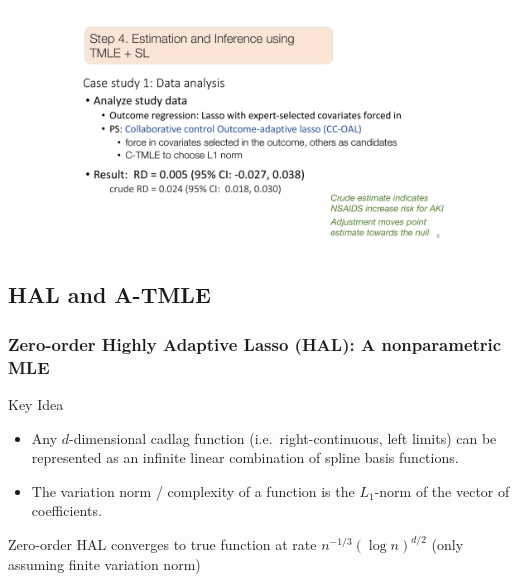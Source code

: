 \documentclass[t]{beamer}
\begin{document}
\begin{frame}
\centering
\begin{figure}
\begin{center}
\includegraphics[width=1.02\textwidth]{figures/abbviepdfslides_8.pdf}
\end{center}
\end{figure}
\end{frame}

\subsection{HAL and A-TMLE}

\begin{frame}
\frametitle{Zero-order Highly Adaptive Lasso (HAL): A nonparametric MLE}
\begin{block}{\large{Key Idea}}
\begin{itemize}
\vspace{.1in}
\item Any $d$-dimensional cadlag function (i.e.~right-continuous, left limits)
can be represented as an infinite linear combination of spline basis functions.
\vspace{.05in}
\item The variation norm / complexity of a function is the $L_1$-norm of the vector of coefficients.
\vspace{.1in}
\end{itemize}
\end{block}
\vspace{0.25in}
\begin{center}
{\large Zero-order HAL converges to true function at rate $n^{-1/3}(\log n)^{d/2}$ (only assuming finite variation norm)}
\end{center}
\end{frame}
\end{document}
